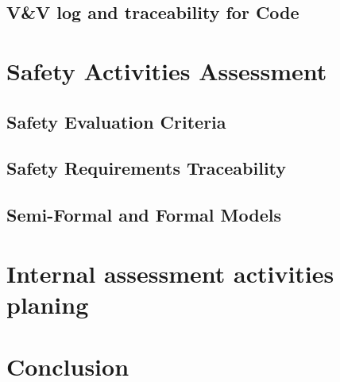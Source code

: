 \documentclass{template/openetcs_report}
\begin{document}
\section{V\&V log and traceability for Code}


\chapter{Safety Activities Assessment}

\section{Safety Evaluation Criteria}

\section{Safety Requirements Traceability}

\section{Semi-Formal and Formal Models}

\chapter{Internal assessment activities planing}

\chapter{Conclusion}




\end{document}
